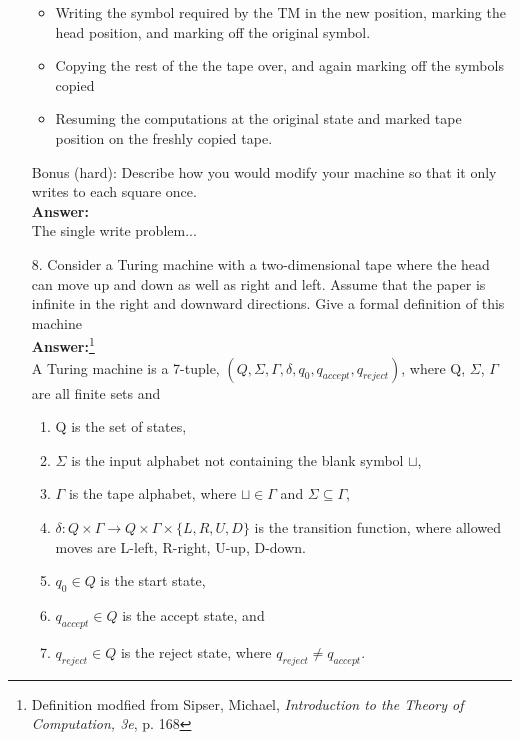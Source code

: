 \documentclass[12pt]{amsart}
\begin{document}
\begin{itemize}
\begin{itemize}
	\item Writing the symbol required by the TM in the new position, marking the head position, and marking off the original symbol.
	\item Copying the rest of the the tape over, and again marking off the symbols copied
	\item Resuming the computations at the original state and marked tape position on the freshly copied tape.
\end{itemize}
\vspace{.2in}
Bonus (hard): Describe how you would modify your machine so that it only writes to each square once.
\\[.2in] \textbf{Answer:}
\\[.2in]The single write problem...
\vspace{.2in}
\item[{\rm 8.}] Consider a Turing machine with a two-dimensional tape where the head can move up and down as well as right and left.  Assume that the paper is infinite in the right and downward directions.  Give a formal definition of this machine
\\[.2in]\textbf{Answer:}\footnote{Definition modfied from Sipser, Michael, \textit{Introduction to the Theory of Computation, 3e}, p. 168}
\vspace{.2in}
\\ A Turing machine is a 7-tuple, $(Q, \Sigma, \Gamma, \delta, q_{0}, q_{accept}, q_{reject})$, where Q, $\Sigma$, $\Gamma$ are all finite sets and
\begin{enumerate}
\item Q is the set of states,
\item $\Sigma$ is the input alphabet not containing the blank symbol $\sqcup$, 
\item $\Gamma$ is the tape alphabet, where $\sqcup \in \Gamma$ and $\Sigma \subseteq \Gamma$,
\item $\delta:Q\times\Gamma \rightarrow Q\times\Gamma \times\{L,R,U,D\}$ is the transition function, where allowed moves are L-left, R-right, U-up, D-down.
\item $q_{0} \in Q$ is the start state,
\item $q_{accept} \in Q$ is the accept state, and
\item $q_{reject} \in Q$ is the reject state, where $q_{reject} \neq q_{accept}$.
\end{enumerate}

\vspace{.2in}

\end{itemize}
 
 
\end{document}
